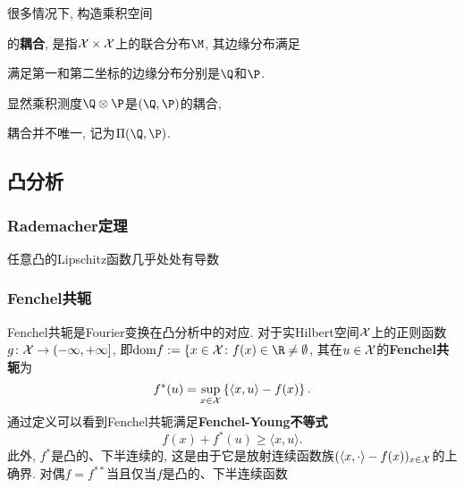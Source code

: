 很多情况下, 构造乘积空间

的\textbf{耦合}, 是指$\mathcal{X} \times \mathcal{X}$上的联合分布$\M$, 其边缘分布满足

满足第一和第二坐标的边缘分布分别是$\Q$和$\P$.


显然乘积测度$\Q \otimes \P$是$(\Q, \P)$的耦合, 

耦合并不唯一, 记为$\Pi(\Q, \P)$. 


\subsection{凸分析}

\subsubsection{Rademacher定理}

\begin{theorem}[Rademacher]\label{thm:Rademacher}
	任意凸的Lipschitz函数几乎处处有导数
\end{theorem}


\subsubsection{Fenchel共轭}

Fenchel共轭是Fourier变换在凸分析中的对应. 
对于实Hilbert空间$\mathcal{X}$上的正则函数$g \colon \mathcal{X} \to (-\infty, +\infty]$, 即$\mathrm{dom} f := \{x \in \cX \colon f(x) \in \R \neq \emptyset$, 其在$u \in \mathcal{X}$的\textbf{Fenchel共轭}为
\begin{equation}
	f^*(u) = \sup_{x \in \mathcal{X}} \left\{ \langle x, u \rangle - f(x) \right\}. 
\end{equation}
通过定义可以看到Fenchel共轭满足\textbf{Fenchel-Young不等式}
\begin{equation}
	f(x) + f^*(u) \geq \langle x, u \rangle. 
\end{equation}
此外, $f^*$是凸的、下半连续的, 这是由于它是放射连续函数族$(\langle x, \cdot \rangle - f(x))_{x \in \mathcal{X}}$的上确界. 
对偶$f = f^{**}$当且仅当$f$是凸的、下半连续函数














































